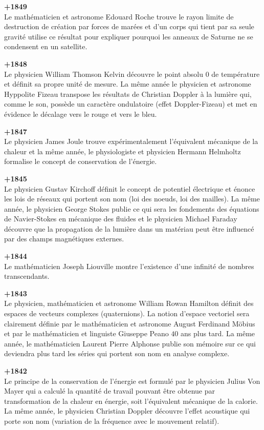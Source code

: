 \textbf{+1849}\\
Le mathématicien et astronome Edouard Roche trouve le rayon limite de destruction de création par forces de marées et d'un corps qui tient par sa seule gravité utilise ce résultat pour expliquer pourquoi les anneaux de Saturne ne se condensent en un satellite.

\textbf{+1848}\\
Le physicien William Thomson Kelvin découvre le point absolu $0$ de température et définit sa propre unité de mesure. La même année le physicien et astronome Hyppolite Fizeau transpose les résultats de Christian Doppler à la lumière qui, comme le son, possède un caractère ondulatoire (effet Doppler-Fizeau) et met en évidence le décalage vers le rouge et vers le bleu.

\textbf{+1847}\\
Le physicien James Joule trouve expérimentalement l'équivalent mécanique de la chaleur et la même année, le physiologiste et physicien Hermann Helmholtz formalise le concept de conservation de l'énergie.

\textbf{+1845}\\
Le physicien Gustav Kirchoff définit le concept de potentiel électrique et énonce les lois de réseaux qui portent son nom (loi des noeuds, loi des mailles). La même année, le physicien George Stokes publie ce qui sera les fondements des équations de Navier-Stokes en mécanique des fluides et le physicien Michael Faraday découvre que la propagation de la lumière dans un matériau peut être influencé par des champs magnétiques externes.

\textbf{+1844}\\
Le mathématicien Joseph Liouville montre l'existence d'une infinité de nombres transcendants.

\textbf{+1843}\\
Le physicien, mathématicien et astronome William Rowan Hamilton définit des espaces de vecteurs complexes (quaternions). La notion d'espace vectoriel sera clairement définie par le mathématicien et astronome August Ferdinand Möbius et par le mathématicien et linguiste Giuseppe Peano $40$ ans plus tard. La même année, le mathématicien Laurent Pierre Alphonse publie son mémoire sur ce qui deviendra plus tard les séries qui portent son nom en analyse complexe.

\textbf{+1842}\\
Le principe de la conservation de l'énergie est formulé par le physicien Julius Von Mayer qui a calculé la quantité de travail pouvant être obtenue par transformation de la chaleur en énergie, soit l'équivalent mécanique de la calorie. La même année, le physicien Christian Doppler découvre l'effet acoustique qui porte son nom (variation de la fréquence avec le mouvement relatif).

